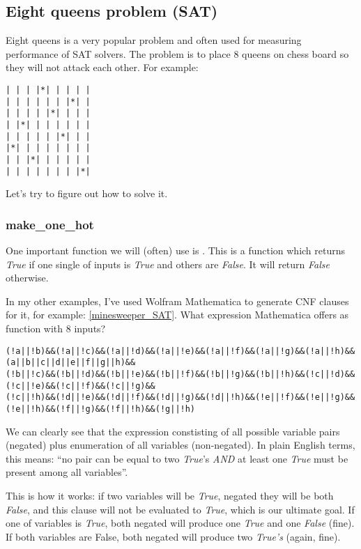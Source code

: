 \subsection{Eight queens problem (SAT)}
\label{EightQueens}

\renewcommand{\CURPATH}{puzzles/8queens}

Eight queens is a very popular problem and often used for measuring performance of SAT solvers.
The problem is to place 8 queens on chess board so they will not attack each other.
For example:

\begin{lstlisting}
| | | |*| | | | |
| | | | | | |*| |
| | | | |*| | | |
| |*| | | | | | |
| | | | | |*| | |
|*| | | | | | | |
| | |*| | | | | |
| | | | | | | |*|
\end{lstlisting}

Let's try to figure out how to solve it.

\subsubsection{make\_one\_hot}
\label{POPCNTOne}

One important function we will (often) use is .
This is a function which returns \textit{True} if one single of inputs is \textit{True} and others are \textit{False}.
It will return \textit{False} otherwise.

In my other examples, I've used Wolfram Mathematica to generate CNF clauses for it, for example: \ref{minesweeper_SAT}.
What expression Mathematica offers as  function with 8 inputs?

\begin{lstlisting}
(!a||!b)&&(!a||!c)&&(!a||!d)&&(!a||!e)&&(!a||!f)&&(!a||!g)&&(!a||!h)&&(a||b||c||d||e||f||g||h)&&
(!b||!c)&&(!b||!d)&&(!b||!e)&&(!b||!f)&&(!b||!g)&&(!b||!h)&&(!c||!d)&&(!c||!e)&&(!c||!f)&&(!c||!g)&&
(!c||!h)&&(!d||!e)&&(!d||!f)&&(!d||!g)&&(!d||!h)&&(!e||!f)&&(!e||!g)&&(!e||!h)&&(!f||!g)&&(!f||!h)&&(!g||!h)
\end{lstlisting}

We can clearly see that the expression constisting of all possible variable pairs (negated) plus
enumeration of all variables (non-negated).
In plain English terms, this means: ``no pair can be equal to two \textit{True}'s \textit{AND} at least one \textit{True}
must be present among all variables''.

This is how it works: if two variables will be \textit{True}, negated they will be both \textit{False},
and this clause will not be evaluated
to \textit{True}, which is our ultimate goal.
If one of variables is \textit{True}, both negated will produce one \textit{True} and one \textit{False} (fine).
If both variables are False, both negated will produce two \textit{True's} (again, fine).

